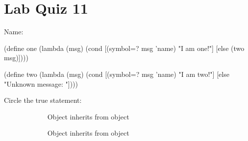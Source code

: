 \documentclass{article}
\begin{document}
\section*{Lab Quiz 11}

\bigskip
\bigskip
Name: \underline{\hspace*{4in}}

\bigskip
\setlength{\parskip}{8pt}

\begin{schemedisplay}
  (define one
    (lambda (msg)
      (cond
        [(symbol=? msg 'name)
         "I am one!"]
        [else
         (two msg)])))

  (define two
    (lambda (msg)
      (cond
        [(symbol=? msg 'name)
         "I am two!"]
        [else
         "Unknown message: "])))
\end{schemedisplay}

\bigskip
Circle the true statement:
\bigskip

~~~~~~~~~~~~ Object  inherits from object 

\medskip

~~~~~~~~~~~~ Object  inherits from object 
\end{document}
